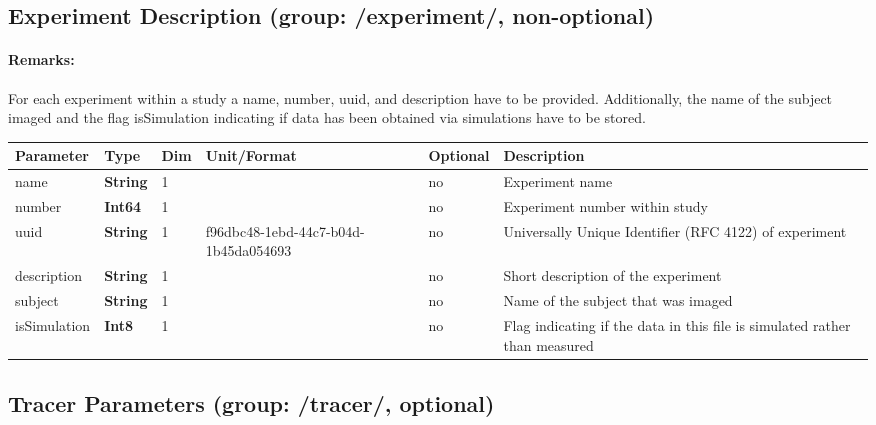 \documentclass[landscape,a4paper]{article} %
\newcommand{\inltab}[1]{{\ttfamily\bfseries\color{blue}#1}}
\newcommand{\inlvar}[1]{{\ttfamily#1}}
\begin{document}
\subsection{Experiment Description (group: \inlvar{/experiment/}, non-optional)}

\begin{multicols}{2}
\paragraph{Remarks:} For each experiment within a study a \inlvar{name}, \inlvar{number}, \inlvar{uuid}, and \inlvar{description} have to be provided. Additionally, the name of the \inlvar{subject} imaged and the flag \inlvar{isSimulation} indicating if data has been obtained via simulations have to be stored.
\end{multicols}

\noindent \begin{tabularx}{\columnwidth}{lllllX} 
\textbf{Parameter} & \textbf{Type} & \textbf{Dim} & \textbf{Unit/Format} & \textbf{Optional} & \textbf{Description} \\ \hline 
\inlvar{name} & \inltab{String} & 1 & & no & Experiment name \\ \hline
\inlvar{number} & \inltab{Int64} & 1 & & no & Experiment number within study\\ \hline
\inlvar{uuid} & \inltab{String} & 1 & f96dbc48-1ebd-44c7-b04d-1b45da054693 & no & Universally Unique Identifier (RFC 4122) of experiment \\ \hline 
\inlvar{description} & \inltab{String} & 1 & & no & Short description of the experiment \\ \hline
\inlvar{subject} & \inltab{String} & 1 & & no & Name of the subject that was imaged \\ \hline 
\inlvar{isSimulation} & \inltab{Int8} & 1 & & no & Flag indicating if the data in this file is simulated rather than measured \\ \hline
\end{tabularx}


\subsection{Tracer Parameters (group: \inlvar{/tracer/}, optional)}
\end{document}

